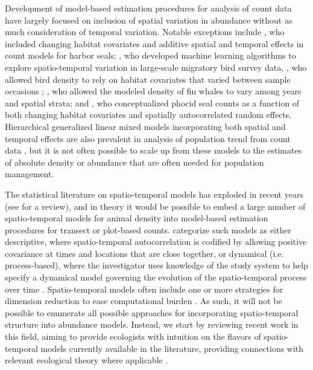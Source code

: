 \documentclass[12pt,english]{article}
\begin{document}
\begin{spacing}{1.9}
Development of model-based estimation procedures for analysis of count data have largely focused on inclusion of spatial variation in abundance without as much consideration of temporal variation.  Notable exceptions include \citet{VerHoefJansen2007}, who included changing habitat covariates and additive spatial and temporal effects in count models for harbor seals; \citet{FinkEtAl2010}, who developed machine learning algorithms to explore spatio-temporal variation in large-scale migratory bird survey data, \citet{MillerEtAl11jwm}, who allowed bird density to rely on habitat covariates that varied between sample occasions \citep[using an N-mixture formulation; see][]{Royle2004}; \citet{Moore2011}, who allowed the modeled density of fin whales to vary among years and spatial strata; and \citet{VerHoefEtAl2014}, who conceptualized phocid seal counts as a function of both changing habitat covariates and spatially autocorrelated random effects.  Hierarchical generalized linear mixed models incorporating both spatial and temporal effects are also prevalent in analysis of population trend from count data \citep[e.g.,][]{SauerLink2011,RossEtAl2012}, but it is not often possible to scale up from these models to the estimates of absolute density or abundance that are often needed for population management.

The statistical literature on spatio-temporal models has exploded in recent years (see \citeauthor{CressieWikle2011} \citeyear{CressieWikle2011} for a review), and in theory it would be possible to embed a large number of spatio-temporal models for animal density into model-based estimation procedures for transect or plot-based counts.  \citet{CressieWikle2011} categorize such models as either descriptive, where spatio-temporal autocorrelation is codified by allowing positive covariance at times and locations that are close together, or dynamical (i.e. process-based), where the investigator uses knowledge of the study system to help specify a dynamical model governing the evolution of the spatio-temporal process over time \citep[e.g., via difference equations;][]{WikleHooten2010}.  Spatio-temporal models often include one or more strategies for dimension reduction to ease computational burden \citep[of which there are many; for a review see][]{Wikle2010}.  As such, it will not be possible to enumerate all possible approaches for incorporating spatio-temporal structure into abundance models.
Instead, we start by reviewing recent work in this field, aiming to provide ecologists with intuition on the flavors of spatio-temporal models currently available in the literature, providing connections with relevant ecological theory where applicable \citep[e.g., with ideal free distributions;][]{FretwellLucas1970}.


\end{spacing}
\end{document}
